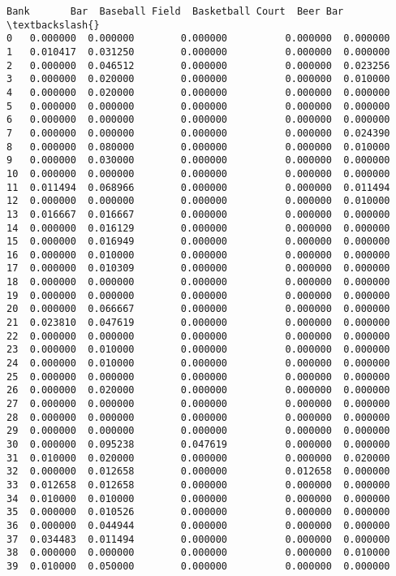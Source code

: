 \documentclass[11pt]{article}
\begin{document}
\begin{tcolorbox}[breakable, size=fbox, boxrule=.5pt, pad at break*=1mm, opacityfill=0]
\begin{Verbatim}[commandchars=\\\{\}]
        Bank       Bar  Baseball Field  Basketball Court  Beer Bar  \textbackslash{}
0   0.000000  0.000000        0.000000          0.000000  0.000000
1   0.010417  0.031250        0.000000          0.000000  0.000000
2   0.000000  0.046512        0.000000          0.000000  0.023256
3   0.000000  0.020000        0.000000          0.000000  0.010000
4   0.000000  0.020000        0.000000          0.000000  0.000000
5   0.000000  0.000000        0.000000          0.000000  0.000000
6   0.000000  0.000000        0.000000          0.000000  0.000000
7   0.000000  0.000000        0.000000          0.000000  0.024390
8   0.000000  0.080000        0.000000          0.000000  0.010000
9   0.000000  0.030000        0.000000          0.000000  0.000000
10  0.000000  0.000000        0.000000          0.000000  0.000000
11  0.011494  0.068966        0.000000          0.000000  0.011494
12  0.000000  0.000000        0.000000          0.000000  0.010000
13  0.016667  0.016667        0.000000          0.000000  0.000000
14  0.000000  0.016129        0.000000          0.000000  0.000000
15  0.000000  0.016949        0.000000          0.000000  0.000000
16  0.000000  0.010000        0.000000          0.000000  0.000000
17  0.000000  0.010309        0.000000          0.000000  0.000000
18  0.000000  0.000000        0.000000          0.000000  0.000000
19  0.000000  0.000000        0.000000          0.000000  0.000000
20  0.000000  0.066667        0.000000          0.000000  0.000000
21  0.023810  0.047619        0.000000          0.000000  0.000000
22  0.000000  0.000000        0.000000          0.000000  0.000000
23  0.000000  0.010000        0.000000          0.000000  0.000000
24  0.000000  0.010000        0.000000          0.000000  0.000000
25  0.000000  0.000000        0.000000          0.000000  0.000000
26  0.000000  0.020000        0.000000          0.000000  0.000000
27  0.000000  0.000000        0.000000          0.000000  0.000000
28  0.000000  0.000000        0.000000          0.000000  0.000000
29  0.000000  0.000000        0.000000          0.000000  0.000000
30  0.000000  0.095238        0.047619          0.000000  0.000000
31  0.010000  0.020000        0.000000          0.000000  0.020000
32  0.000000  0.012658        0.000000          0.012658  0.000000
33  0.012658  0.012658        0.000000          0.000000  0.000000
34  0.010000  0.010000        0.000000          0.000000  0.000000
35  0.000000  0.010526        0.000000          0.000000  0.000000
36  0.000000  0.044944        0.000000          0.000000  0.000000
37  0.034483  0.011494        0.000000          0.000000  0.000000
38  0.000000  0.000000        0.000000          0.000000  0.010000
39  0.010000  0.050000        0.000000          0.000000  0.000000


\end{Verbatim}
\end{tcolorbox}
\end{document}
